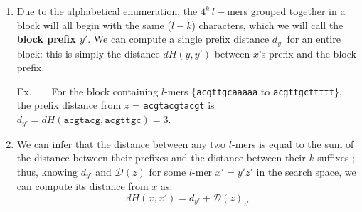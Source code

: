 \documentclass[oneside,12pt]{DISCSthesis}
\begin{document}
{\begin{enumerate}
			The value in the $p^{th}$ cell---found at row $\frac{p}{32}$, column $p\ \emph{mod}\ 32$---of the $32 \times 32$ table in Figure 4.\ref{fig:D_tacgt} is the distance $dH (z, z’)$ from $z$ = \texttt{tacgt} to the $k$-suffix $z'$ which maps to the binary number $p$.

				{\small\hspace*{40pt}Ex. $D(\texttt{tacgt})_{100}$\ \ \ \ \ = $dH(\texttt{tacgt}, \texttt{0b0001100100})$
				\newline\hspace*{137pt} = $dH(\texttt{tacgt}, \texttt{acgca})$
				\newline\hspace*{137pt} = 5 ,\ \ \ \ at row $\frac{100}{32} = 3$, column $(100\ \emph{mod}\ 32) = 4$
				}\newline

			\item Due to the alphabetical enumeration, the $4^k\ l-$mers grouped together in a block will all begin with the same ($l - k$) characters, which we will call the {\bf\boldmath block prefix $y'$}. We can compute a single prefix distance $d_{y'}$ for an entire block: this is simply the distance $dH(y, y')$ between $x$'s prefix and the block prefix.

				{\small\hspace*{40pt} Ex.\ \ \ \ For the block containing $l$-mers \{\texttt{acgttgcaaaaa} to \texttt{acgttgcttttt}\},
				\newline\hspace*{70pt} the prefix distance from $z$ = \texttt{acgtacgtacgt} is 
				\newline\hspace*{70pt} $d_{y'} = dH(\texttt{acgtacg}, \texttt{acgttgc}) = 3.$
				}

			\item We can infer that the distance between any two $l$-mers is equal to the sum of the distance between their prefixes and the distance between their $k$-suffixes %
			; thus, knowing $d_{y'}$ and $\mathcal{D}(z)$ for some $l$-mer $x' = y'z'$ in the search space, we can compute its distance from $x$ as:
				\begin{equation}
					dH(x,x') = d_{y'} + \mathcal{D}(z)_{z'}
					\end{equation}


\end{enumerate}}
\end{document}
